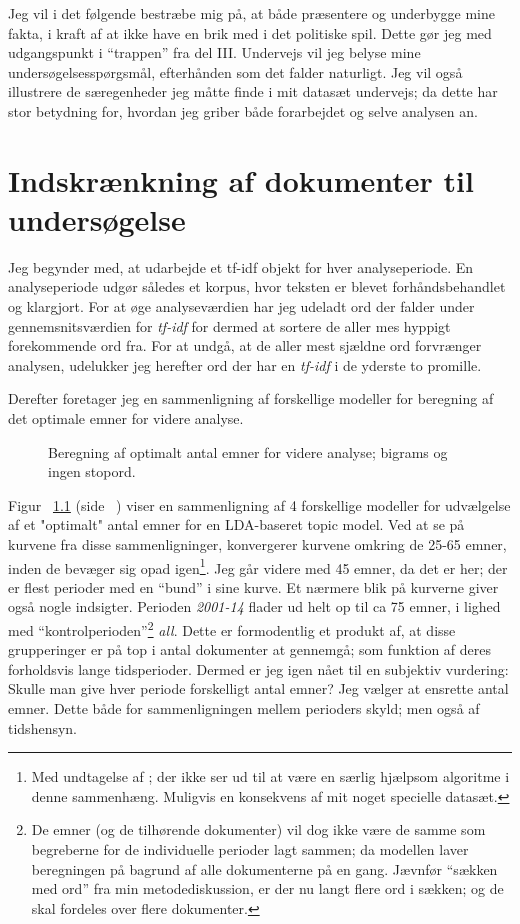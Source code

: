 Jeg vil i det følgende bestræbe mig på, at både præsentere og underbygge mine fakta, i kraft af at ikke have en brik med i det politiske spil.
Dette gør jeg med udgangspunkt i “trappen” fra del III.
Undervejs vil jeg belyse mine undersøgelsesspørgsmål, efterhånden som det falder naturligt.
Jeg vil også illustrere de særegenheder jeg måtte finde i mit datasæt undervejs; da dette har stor betydning for, hvordan jeg griber både forarbejdet og selve analysen an.

\chapter{Indskrænkning af dokumenter til undersøgelse}

Jeg begynder med, at udarbejde et tf-idf objekt for hver analyseperiode.
En analyseperiode udgør således et korpus, hvor teksten er blevet forhåndsbehandlet og klargjort.
For at øge analyseværdien har jeg udeladt ord der falder under gennemsnitsværdien for \textit{tf-idf} for dermed at sortere de aller mes hyppigt forekommende ord fra.
For at undgå, at de aller mest sjældne ord forvrænger analysen, udelukker jeg herefter ord der har en \textit{tf-idf} i de yderste to promille.

Derefter foretager jeg en sammenligning af forskellige modeller for beregning af det optimale emner for videre analyse.

\begin{figure}

\caption{Beregning af optimalt antal emner for videre analyse; bigrams og ingen stopord.}
\label{fig:modelsFull}
\end{figure}

Figur ~\ref{fig:modelsFull} (side ~\pageref{fig:modelsFull}) viser en sammenligning af 4 forskellige modeller for udvælgelse af et "optimalt" antal emner for en LDA-baseret topic model.
Ved at se på kurvene fra disse sammenligninger, konvergerer kurvene omkring de 25-65 emner, inden de bevæger sig opad igen\footnote{Med undtagelse af \autocite{deveaudAccurateEffectiveLatent2014}; der ikke ser ud til at være en særlig hjælpsom algoritme i denne sammenhæng. Muligvis en konsekvens af mit noget specielle datasæt.}.
Jeg går videre med 45 emner, da det er her; der er flest perioder med en “bund” i sine kurve.
Et nærmere blik på kurverne giver også nogle indsigter.
Perioden \textit{2001-14} flader ud helt op til ca 75 emner, i lighed med “kontrolperioden”\footnote{
De emner (og de tilhørende dokumenter) vil dog ikke være de samme som begreberne for de individuelle perioder lagt sammen; da modellen laver beregningen på bagrund af alle dokumenterne på en gang.
Jævnfør “sækken med ord” fra min metodediskussion, er der nu langt flere ord i sækken; og de skal fordeles over flere dokumenter.}
\textit{all}.
Dette er formodentlig et produkt af, at disse grupperinger er på top i antal dokumenter at gennemgå; som funktion af deres forholdsvis lange tidsperioder.
Dermed er jeg igen nået til en subjektiv vurdering:
Skulle man give hver periode forskelligt antal emner?
Jeg vælger at ensrette antal emner. 
Dette både for sammenligningen mellem perioders skyld;
men også af tidshensyn.

